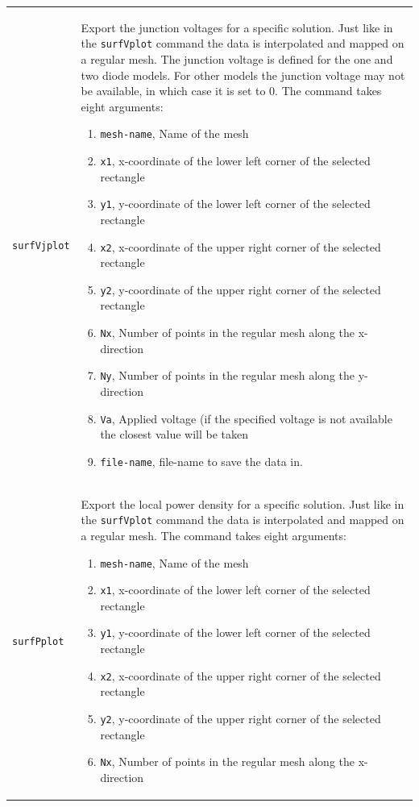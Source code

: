 \documentclass[noshowpacs,preprintnumbers,amsmath,amssymb, letter]{revtex4}
\begin{document}
\begin{longtable}{p{}p{}}
\texttt{surfVjplot}		& Export the junction voltages for a specific solution. Just like in the \texttt{surfVplot} command the data is interpolated and mapped on a regular mesh. The junction voltage is defined for the one and two diode models. For other models the junction voltage may not be available, in which case it is set to 0. The command takes eight arguments:
\begin{enumerate}
\item \texttt{mesh-name}, Name of the mesh
\item \texttt{x1}, x-coordinate of the lower left corner of the selected rectangle
\item \texttt{y1}, y-coordinate of the lower left corner of the selected rectangle
\item \texttt{x2}, x-coordinate of the upper right corner of the selected rectangle
\item \texttt{y2}, y-coordinate of the upper right corner of the selected rectangle
\item \texttt{Nx}, Number of points in the regular mesh along the x-direction
\item \texttt{Ny}, Number of points in the regular mesh along the y-direction
\item \texttt{Va}, Applied voltage (if the specified voltage is not available the closest value will be taken
\item \texttt{file-name}, file-name to save the data in.
\end{enumerate}\\
\texttt{surfPplot}		& Export the local power density for a specific solution. Just like in the \texttt{surfVplot} command the data is interpolated and mapped on a regular mesh. The command takes eight arguments:
\begin{enumerate}
\item \texttt{mesh-name}, Name of the mesh
\item \texttt{x1}, x-coordinate of the lower left corner of the selected rectangle
\item \texttt{y1}, y-coordinate of the lower left corner of the selected rectangle
\item \texttt{x2}, x-coordinate of the upper right corner of the selected rectangle
\item \texttt{y2}, y-coordinate of the upper right corner of the selected rectangle
\item \texttt{Nx}, Number of points in the regular mesh along the x-direction

\end{enumerate}
\end{longtable}
\end{document}
